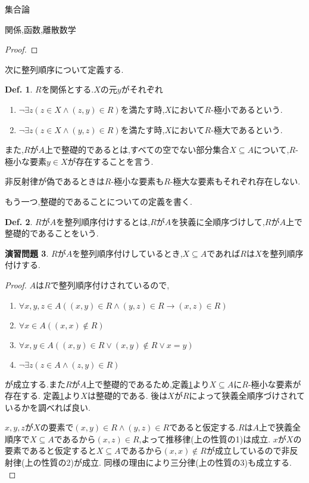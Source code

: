 \documentclass[14pt]{jsarticle}
\theoremstyle{definition}
\newtheorem{dfn}{Def.}[subsection]
\newtheorem{doril}[dfn]{演習問題}
\begin{document}
\begin{section}{集合論}
\begin{subsection}{関係,函数,離散数学}
\begin{proof}
\end{proof}
次に整列順序について定義する.
\begin{dfn}
\label{supinfdef}
$R$を関係とする.$X$の元$y$がそれぞれ
\begin{enumerate}
	\item $\lnot \exists z(z \in X \land (z,y)\in R)$を満たす時,$X$において$R$-極小であるという.
	\item $\lnot \exists z(z \in X \land (y,z)\in R)$を満たす時,$X$において$R$-極大であるという.
\end{enumerate}
また,$R$が$A$上で整礎的であるとは,すべての空でない部分集合$X\subseteq A$について,$R$-極小な要素$y\in X$が存在することを言う.
\end{dfn}
非反射律が偽であるときは$R$-極小な要素も$R$-極大な要素もそれぞれ存在しない.\\\par
もう一つ,整礎的であることについての定義を書く.
\begin{dfn}
\label{well-ordereddef}
$R$が$A$を整列順序付けするとは,$R$が$A$を狭義に全順序づけして,$R$が$A$上で整礎的であることをいう.
\end{dfn}
\begin{doril}
\label{subsetwell-ordered}
$R$が$A$を整列順序付けしているとき,$X\subseteq A$であれば$R$は$X$を整列順序付けする.
\end{doril}
\begin{proof}
$A$は$R$で整列順序付けされているので,
\begin{enumerate}
	\item $\forall x,y,z \in A((x,y)\in R \land (y,z) \in R \to (x,z) \in R)$
	\item $\forall x \in A((x,x) \not \in R)$
	\item $\forall x,y \in A((x,y) \in R \lor (x,y) \not \in R \lor x=y)$
	\item $\lnot \exists z(z \in A \land (z,y)\in R)$
\end{enumerate}
が成立する.また$R$が$A$上で整礎的であるため,定義\ref{supinfdef}より$X\subseteq A$に$R$-極小な要素が存在する.
定義\ref{supinfdef}より$X$は整礎的である.
後は$X$が$R$によって狭義全順序づけされているかを調べれば良い.\par
$x,y,z$が$X$の要素で$(x,y)\in R \land (y,z)\in R$であると仮定する.$R$は$A$上で狭義全順序で$X\subseteq A$であるから$(x,z)\in R$,よって推移律(上の性質の1)は成立.
$x$が$X$の要素であると仮定すると$X \subseteq A$であるから$(x,x)\not \in R$が成立しているので非反射律(上の性質の2)が成立.
同様の理由により三分律(上の性質の3)も成立する.\\

\end{proof}
\end{subsection}
\end{section}
\end{document}
